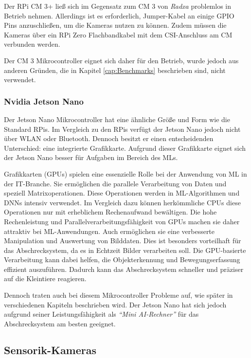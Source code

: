 Der \ac{RPi} \ac{CM} 3+ ließ sich im Gegensatz zum \ac{CM} 3 von \textit{Radxa} problemlos in Betrieb nehmen. Allerdings ist es erforderlich, Jumper-Kabel an einige \ac{GPIO} Pins anzuschließen, um die Kameras nutzen zu können. Zudem müssen die Kameras über ein \ac{RPi} Zero Flachbandkabel mit dem \acs{CSI}-Anschluss am \ac{CM} verbunden werden. \cite{cm3}

Der \ac{CM} 3 Mikrocontroller eignet sich daher für den Betrieb, wurde jedoch aus anderen Gründen, die in Kapitel \ref{cap:Benchmarks} beschrieben sind, nicht verwendet.

\subsubsection{Nvidia Jetson Nano}

Der Jetson Nano Mikrocontroller hat eine ähnliche Größe und Form wie die Standard \ac{RPi}s. Im Vergleich zu den \ac{RPi}s verfügt der Jetson Nano jedoch nicht über WLAN oder Bluetooth. Dennoch besitzt er einen entscheidenden Unterschied: eine integrierte Grafikkarte. Aufgrund dieser Grafikkarte eignet sich der Jetson Nano besser für Aufgaben im Bereich des \acl{ML}s. \cite{nvidia_jn}

Grafikkarten (\acs{GPU}s) spielen eine essenzielle Rolle bei der Anwendung von \ac{ML} in der IT-Branche. Sie ermöglichen die parallele Verarbeitung von Daten und speziell Matrixoperationen. Diese Operationen werden in \ac{ML}-Algorithmen und \ac{DNN}s intensiv verwendet. Im Vergleich dazu können herkömmliche CPUs diese Operationen nur mit erheblichem Rechenaufwand bewältigen. Die hohe Rechenleistung und Parallelverarbeitungsfähigkeit von GPUs machen sie daher attraktiv bei \ac{ML}-Anwendungen. Auch ermöglichen sie eine verbesserte Manipulation und Auswertung von Bilddaten. Dies ist besonders vorteilhaft für das Abschrecksystem, da es in Echtzeit Bilder verarbeiten soll.
Die \ac{GPU}-basierte Verarbeitung kann dabei helfen, die Objekterkennung und Bewegungserfassung effizient auszuführen. Dadurch kann das Abschrecksystem schneller und präziser auf die Kleintiere reagieren. \cite{gpus}

Dennoch traten auch bei diesem Mikrocontroller Probleme auf, wie später in verschiedenen Kapiteln beschrieben wird. Der Jetson Nano hat sich jedoch aufgrund seiner Leistungsfähigkeit als \textit{"`Mini AI-Rechner"'} für das Abschrecksystem am besten geeignet.

\subsection{Sensorik-Kameras}

